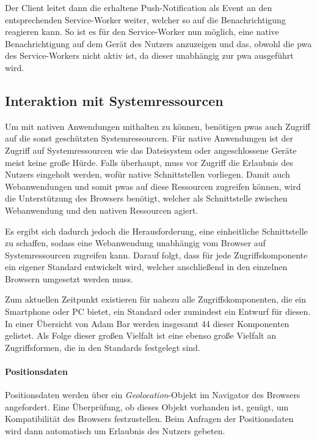 \documentclass[12pt, parskip=half]{scrartcl}       %
\begin{document}
Der Client leitet dann die erhaltene Push-Notification als Event an den entsprechenden Service-Worker weiter, welcher so auf die Benachrichtigung reagieren kann.
So ist es für den Service-Worker nun möglich, eine native Benachrichtigung auf dem Gerät des Nutzers anzuzeigen und das, obwohl die \ac{pwa} des Service-Workers nicht aktiv ist, da dieser unabhängig zur \ac{pwa} ausgeführt wird.


\subsection{Interaktion mit Systemressourcen}

Um mit nativen Anwendungen mithalten zu können, benötigen \acp{pwa} auch Zugriff auf die sonst geschützten Systemressourcen.
Für native Anwendungen ist der Zugriff auf Systemressourcen wie das Dateisystem oder angeschlossene Geräte meist keine große Hürde.
Falls überhaupt, muss vor Zugriff die Erlaubnis des Nutzers eingeholt werden, wofür native Schnittstellen vorliegen.
Damit auch Webanwendungen und somit \acp{pwa} auf diese Ressourcen zugreifen können, wird die Unterstützung des Browsers benötigt, welcher als Schnittstelle zwischen Webanwendung und den nativen Ressourcen agiert.

Es ergibt sich dadurch jedoch die Herausforderung, eine einheitliche Schnittstelle zu schaffen, sodass eine Webanwendung unabhängig vom Browser auf Systemressourcen zugreifen kann.
Darauf folgt, dass für jede Zugriffskomponente ein eigener Standard entwickelt wird, welcher anschließend in den einzelnen Browsern umgesetzt werden muss.

Zum aktuellen Zeitpunkt existieren für nahezu alle Zugriffskomponenten, die ein Smartphone oder PC bietet, ein Standard oder zumindest ein Entwurf für diesen.
In einer Übersicht von Adam Bar\cite{bar_webcando} werden insgesamt 44 dieser Komponenten gelistet.
Als Folge dieser großen Vielfalt ist eine ebenso große Vielfalt an Zugriffsformen, die in den Standards festgelegt sind.

\paragraph{Positionsdaten} Positionsdaten werden über ein \textit{Geolocation}-Objekt im Navigator des Browsers angefordert.
Eine Überprüfung, ob dieses Objekt vorhanden ist, genügt, um Kompatibilität des Browsers festzustellen.
Beim Anfragen der Positionsdaten wird dann automatisch um Erlaubnis des Nutzers gebeten\cite{w3c_geolocation}.
\end{document}
